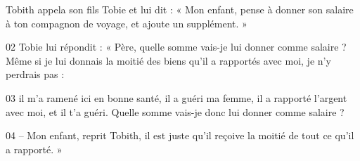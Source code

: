 Tobith appela son fils Tobie et lui dit : « Mon enfant, pense à donner son salaire à ton compagnon de voyage, et ajoute un supplément. »

02 Tobie lui répondit : « Père, quelle somme vais-je lui donner comme salaire ? Même si je lui donnais la moitié des biens qu’il a rapportés avec moi, je n’y perdrais pas :

03 il m’a ramené ici en bonne santé, il a guéri ma femme, il a rapporté l’argent avec moi, et il t’a guéri. Quelle somme vais-je donc lui donner comme salaire ?

04 – Mon enfant, reprit Tobith, il est juste qu’il reçoive la moitié de tout ce qu’il a rapporté. »
